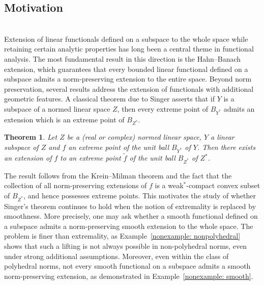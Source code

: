 \documentclass{amsart}
\newtheorem{theorem}{Theorem}[section]
\theoremstyle{definition}
\theoremstyle{remark}
\numberwithin{equation}{section}
\begin{document}
\medskip


\subsection{Motivation}\hfill\\
\noindent Extension of linear functionals defined on a subspace to the whole space while retaining certain analytic properties has long been a central theme in functional analysis. The most fundamental result in this direction is the Hahn–Banach extension, which guarantees that every bounded linear functional defined on a subspace admits a norm-preserving extension to the entire space. Beyond norm preservation, several results address the extension of functionals with additional geometric features. A classical theorem due to Singer asserts that if $Y$ is a subspace of a normed linear space $Z$, then every extreme point of $B_{Y^*}$ admits an extension which is an extreme point of $B_{Z^*}$.

\begin{theorem}\label{Thm: Singer}\cite{S56, S65}
Let $Z$ be a (real or complex) normed linear space, $Y$ a linear subspace of $Z$ and $f$ an extreme point of the unit ball $B_{Y^*}$ of $Y$. Then there exists an extension of $f$ to an extreme point $\widetilde{f}$ of the unit ball $B_{Z^*}$ of $Z^*$.
\end{theorem}



\noindent The result follows from the Krein--Milman theorem and the fact that the
collection of all norm-preserving extensions of $f$ is a weak$^*$-compact
convex subset of $B_{Z^*}$, and hence possesses extreme points. This motivates the study of whether Singer’s theorem continues to hold when the notion of extremality is replaced by smoothness. More precisely, one may ask whether a smooth functional defined on a subspace admits a norm-preserving smooth extension to the whole space. The problem is finer than extremality, as Example~\ref{nonexample: nonpolyhedral} shows that such a lifting is not always possible in non-polyhedral norms, even under strong additional assumptions. Moreover, even within the class of polyhedral norms, not every smooth functional on a subspace admits a smooth norm-preserving extension, as demonstrated in
Example~\ref{nonexample: smooth}.


\medskip
\end{document}
